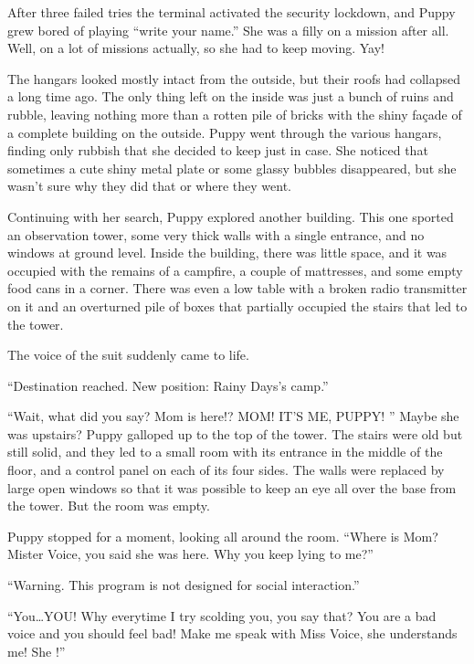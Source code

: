 
After three failed tries the terminal activated the security lockdown, and Puppy grew bored of playing ``write your name.'' She was a filly on a mission after all. Well, on a lot of missions actually, so she had to keep moving. Yay!

The hangars looked mostly intact from the outside, but their roofs had collapsed a long time ago. The only thing left on the inside was just a bunch of ruins and rubble, leaving nothing more than a rotten pile of bricks with the shiny façade of a complete building on the outside. Puppy went through the various hangars, finding only rubbish that she decided to keep just in case. She noticed that sometimes a cute shiny metal plate or some glassy bubbles disappeared, but she wasn't sure why they did that or where they went.

Continuing with her search, Puppy explored another building. This one sported an observation tower, some very thick walls with a single entrance, and no windows at ground level. Inside the building, there was little space, and it was occupied with the remains of a campfire, a couple of mattresses, and some empty food cans in a corner. There was even a low table with a broken radio transmitter on it and an overturned pile of boxes that partially occupied the stairs that led to the tower.

The voice of the suit suddenly came to life.

{\mt ``Destination reached. New position: Rainy Days's camp.''}

``Wait, what did you say? Mom is here!? MOM! IT'S ME, PUPPY! '' Maybe she was upstairs? Puppy galloped up to the top of the tower. The stairs were old but still solid, and they led to a small room with its entrance in the middle of the floor, and a control panel on each of its four sides. The walls were replaced by large open windows so that it was possible to keep an eye all over the base from the tower. But the room was empty.

Puppy stopped for a moment, looking all around the room. ``Where is Mom? Mister Voice, you said she was here. Why you keep lying to me?''

{\mt ``Warning. This program is not designed for social interaction.''}

``You\dots YOU! Why everytime I try scolding you, you say that? You are a bad voice and you should feel bad! Make me speak with Miss Voice, she understands me! She !''

